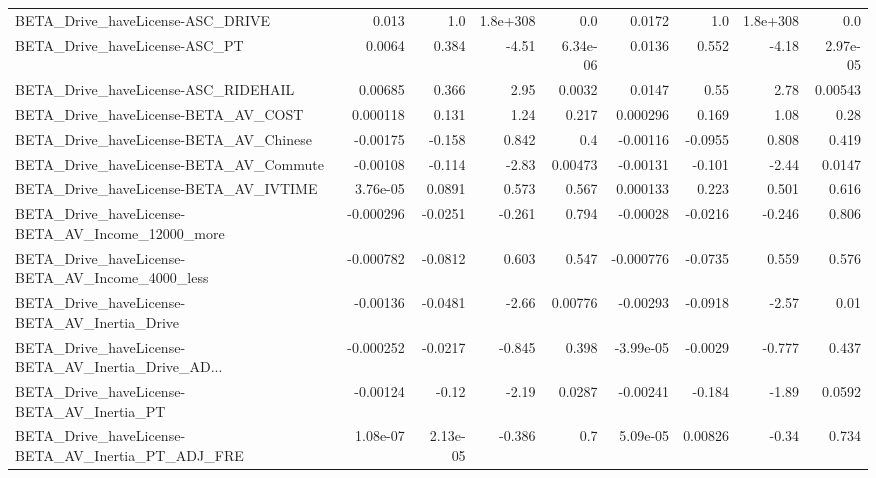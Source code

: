 \begin{tabular}{lrrrrrrrr}
BETA\_Drive\_haveLicense-ASC\_DRIVE                   &       0.013 &          1.0 & 1.8e+308 &      0.0 &     0.0172 &         1.0 &     1.8e+308 &           0.0 \\
BETA\_Drive\_haveLicense-ASC\_PT                      &      0.0064 &        0.384 &    -4.51 & 6.34e-06 &     0.0136 &       0.552 &        -4.18 &      2.97e-05 \\
BETA\_Drive\_haveLicense-ASC\_RIDEHAIL                &     0.00685 &        0.366 &     2.95 &   0.0032 &     0.0147 &        0.55 &         2.78 &       0.00543 \\
BETA\_Drive\_haveLicense-BETA\_AV\_COST                &    0.000118 &        0.131 &     1.24 &    0.217 &   0.000296 &       0.169 &         1.08 &          0.28 \\
BETA\_Drive\_haveLicense-BETA\_AV\_Chinese             &    -0.00175 &       -0.158 &    0.842 &      0.4 &   -0.00116 &     -0.0955 &        0.808 &         0.419 \\
BETA\_Drive\_haveLicense-BETA\_AV\_Commute             &    -0.00108 &       -0.114 &    -2.83 &  0.00473 &   -0.00131 &      -0.101 &        -2.44 &        0.0147 \\
BETA\_Drive\_haveLicense-BETA\_AV\_IVTIME              &    3.76e-05 &       0.0891 &    0.573 &    0.567 &   0.000133 &       0.223 &        0.501 &         0.616 \\
BETA\_Drive\_haveLicense-BETA\_AV\_Income\_12000\_more   &   -0.000296 &      -0.0251 &   -0.261 &    0.794 &   -0.00028 &     -0.0216 &       -0.246 &         0.806 \\
BETA\_Drive\_haveLicense-BETA\_AV\_Income\_4000\_less    &   -0.000782 &      -0.0812 &    0.603 &    0.547 &  -0.000776 &     -0.0735 &        0.559 &         0.576 \\
BETA\_Drive\_haveLicense-BETA\_AV\_Inertia\_Drive       &    -0.00136 &      -0.0481 &    -2.66 &  0.00776 &   -0.00293 &     -0.0918 &        -2.57 &          0.01 \\
BETA\_Drive\_haveLicense-BETA\_AV\_Inertia\_Drive\_AD... &   -0.000252 &      -0.0217 &   -0.845 &    0.398 &  -3.99e-05 &     -0.0029 &       -0.777 &         0.437 \\
BETA\_Drive\_haveLicense-BETA\_AV\_Inertia\_PT          &    -0.00124 &        -0.12 &    -2.19 &   0.0287 &   -0.00241 &      -0.184 &        -1.89 &        0.0592 \\
BETA\_Drive\_haveLicense-BETA\_AV\_Inertia\_PT\_ADJ\_FRE  &    1.08e-07 &     2.13e-05 &   -0.386 &      0.7 &   5.09e-05 &     0.00826 &        -0.34 &         0.734 \\

\end{tabular}
